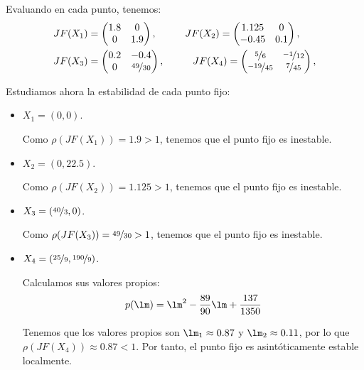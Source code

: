 \begin{ejercicio}
\begin{enumerate}
    Evaluando en cada punto, tenemos:
    \begin{align*}
        &JF(X_1) = \begin{pmatrix}
            1.8 & 0\\
            0 & 1.9
        \end{pmatrix},\hspace{1cm}
        JF(X_2) = \begin{pmatrix}
            1.125 & 0\\
            -0.45 & 0.1
        \end{pmatrix},\\
        &JF(X_3) = \begin{pmatrix}
            0.2 & -0.4\\
            0 & \nicefrac{49}{30}
        \end{pmatrix},\hspace{1cm}
        JF(X_4) = \begin{pmatrix}
            \nicefrac{5}{6} & \nicefrac{-1}{12} \\
            \nicefrac{-19}{45} & \nicefrac{7}{45}
        \end{pmatrix},
    \end{align*}

    Estudiamos ahora la estabilidad de cada punto fijo:
    \begin{itemize}
        \item $X_1=(0,0)$.
        
        Como $\rho(JF(X_1)) = 1.9>1$, tenemos que el punto fijo es inestable.

        \item $X_2=(0,22.5)$.
        
        Como $\rho(JF(X_2)) = 1.125>1$, tenemos que el punto fijo es inestable.

        \item $X_3=(\nicefrac{40}{3},0)$.
        
        Como $\rho(JF(X_3)) = \nicefrac{49}{30}>1$, tenemos que el punto fijo es inestable.

        \item $X_4=(\nicefrac{25}{9},\nicefrac{190}{9})$.
        
        Calculamos sus valores propios:
        \begin{equation*}
            p(\lm) = \lm^2-\frac{89}{90}\lm +\frac{137}{1350}
        \end{equation*}

        Tenemos que los valores propios son $\lm_1\approx 0.87$ y $\lm_2\approx 0.11$,
        por lo que $\rho(JF(X_4)) \approx 0.87<1$. Por tanto, el punto fijo es asintóticamente estable localmente.
    \end{itemize}
\end{enumerate}

\end{ejercicio}

